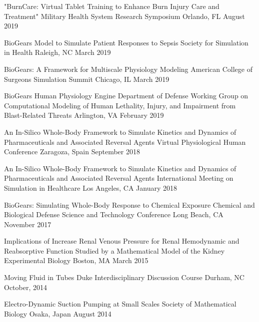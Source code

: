 
\begin{cventries}

  \cventry
    {"BurnCare: Virtual Tablet Training to Enhance Burn Injury Care and Treatment"} %
    {Military Health System Research Symposium} %
    {Orlando, FL} %
    {August 2019} %
     {
     }

  \cventry
    {BioGears Model to Simulate Patient Responses to Sepsis} %
    {Society for Simulation in Health} %
    {Raleigh, NC} %
    {March 2019} %
    {
    }

  \cventry
    {BioGears: A Framework for Multiscale Physiology Modeling} %
    {American College of Surgeons Simulation Summit} %
    {Chicago, IL} %
    {March 2019} %
    {
    }

  \cventry
    {BioGears Human Physiology Engine} %
    {Department of Defense Working Group on Computational Modeling of Human Lethality, Injury, and Impairment from Blast-Related Threats} %
    {Arlington, VA} %
    {February 2019} %
    {
    }

  \cventry
    {An In-Silico Whole-Body Framework to Simulate Kinetics and Dynamics of Pharmaceuticals and Associated Reversal Agents} %
    {Virtual Physiological Human Conference} %
    {Zaragoza, Spain} %
    {September 2018} %
    {
    }

  \cventry
    {An In-Silico Whole-Body Framework to Simulate Kinetics and Dynamics of Pharmaceuticals and Associated Reversal Agents} %
    {International Meeting on Simulation in Healthcare} %
    {Los Angeles, CA} %
    {January 2018} %
    {
    }

      \cventry
    {BioGears: Simulating Whole-Body Response to Chemical Exposure} %
    {Chemical and Biological Defense Science and Technology Conference} %
    {Long Beach, CA} %
    {November 2017} %
    {
    }

     \cventry
    {Implications of Increase Renal Venous Pressure for Renal Hemodynamic and Reabsorptive Function Studied by a Mathematical Model of the Kidney} %
    {Experimental Biology} %
    {Boston, MA} %
    {March 2015} %
    {
    }

    \cventry
    {Moving Fluid in Tubes} %
    {Duke Interdisciplinary Discussion Course} %
    {Durham, NC} %
    {October, 2014} %
    {
    }

    \cventry
    {Electro-Dynamic Suction Pumping at Small Scales} %
    {Society of Mathematical Biology} %
    {Osaka, Japan} %
    {August 2014} %
    {
    }



\end{cventries}
